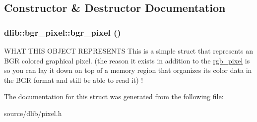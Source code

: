 \subsection{Constructor \& Destructor Documentation}
\hypertarget{structdlib_1_1bgr__pixel_a525b55be99d6be3a3a14d7b111f68708}{
\subsubsection[{bgr\_\-pixel}]{\setlength{\rightskip}{0pt plus 5cm}dlib::bgr\_\-pixel::bgr\_\-pixel ()}}
\label{structdlib_1_1bgr__pixel_a525b55be99d6be3a3a14d7b111f68708}
WHAT THIS OBJECT REPRESENTS This is a simple struct that represents an BGR colored graphical pixel. (the reason it exists in addition to the \hyperlink{structdlib_1_1rgb__pixel}{rgb\_\-pixel} is so you can lay it down on top of a memory region that organizes its color data in the BGR format and still be able to read it) ! 

The documentation for this struct was generated from the following file:\begin{DoxyCompactItemize}
\item 
source/dlib/pixel.h\end{DoxyCompactItemize}
